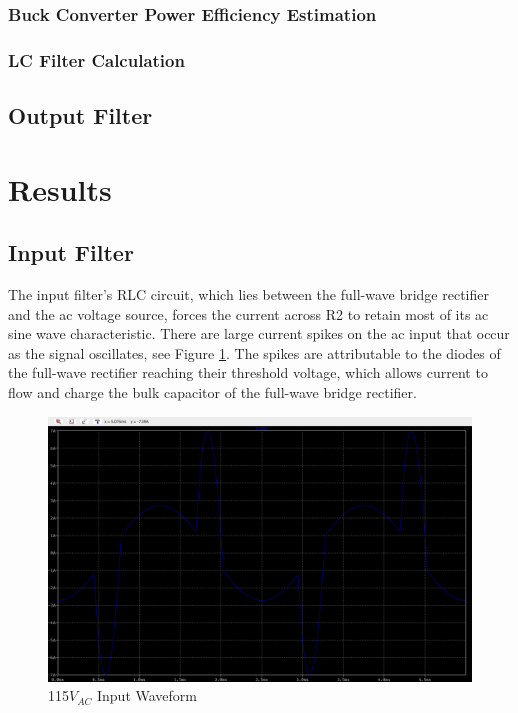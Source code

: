 \documentclass[conference]{IEEEtran}
\begin{document}
\subsubsection{Buck Converter Power Efficiency Estimation}
\subsubsection{LC Filter Calculation}
\subsection{Output Filter}


\section{Results}
\subsection{Input Filter}

The input filter's RLC circuit, which lies between the full-wave bridge rectifier and the ac voltage source, forces the current across R2 to retain most of its ac sine wave characteristic. There are large current spikes on the ac input that occur as the signal oscillates, see Figure \ref{fig:ac_input_waveform}. The spikes are attributable to the diodes of the full-wave rectifier reaching their threshold voltage, which allows current to flow and charge the bulk capacitor of the full-wave bridge rectifier.

\begin{figure}[htp]
    \centering
    \includegraphics[width=1.0\linewidth]{ac_input_waveform.png}
    \caption{115$V_{AC}$ Input Waveform}
    \label{fig:ac_input_waveform}
\end{figure}
\end{document}

